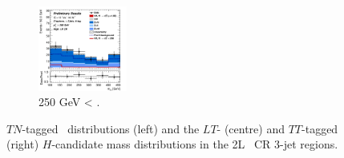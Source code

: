 \begin{figure}[h!]
\begin{subfigure}[b]{\textwidth}
        \includegraphics[width=0.32\textwidth]{Images/VH/Own_fit/postfit_VHcc/Region_distmBB_BMin250_DCRHigh_J3_TTypett_incJet1_T2_L2_Y6051_GlobalFit_conditionnal_mu1.png}
        \caption{250 GeV < \ptv.}
        \label{fig:plots_VHcc_2L_250_CRH_3J}
    \end{subfigure}
    \caption{$TN$-tagged \ptv\ distributions (left) and the $LT$- (centre) and $TT$-tagged (right) $H$-candidate mass distributions in the 2L \highdr\ CR 3-jet regions.}
    \label{fig:plots_VHcc_2L_CRH_3J}
\end{figure}

\vspace*{\fill} \newpage
\vspace*{\fill} 

